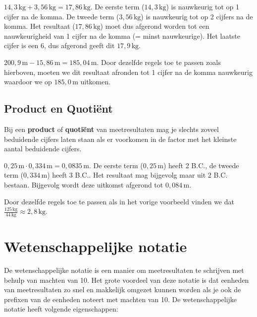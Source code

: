 \documentclass{ximera}
\begin{document}
\begin{example}[title={B.C. Plus}]\nl
    $14{,}3 \, \mathrm{kg} + 3{,}56 \, \mathrm{kg} = 17{,}86 \, \mathrm{kg}$. De eerste term ($14{,}3 \, \mathrm{kg}$) is nauwkeurig tot op 1 cijfer na de komma. De tweede term ($3{,}56 \, \mathrm{kg}$) is nauwkeurig tot op 2 cijfers na de komma. Het resultaat ($17{,}86 \, \mathrm{kg}$) moet dus afgerond worden tot een nauwkeurigheid van 1 cijfer na de komma (= minst nauwkeurige). Het laatste cijfer is een 6, dus afgerond geeft dit $17{,}9 \, \mathrm{kg}$.
\end{example}

\begin{example}[title={B.C. Min}]\nl
    $200{,}9 \, \mathrm{m} - 15{,}86 \, \mathrm{m} = 185{,}04 \, \mathrm{m}$. Door dezelfde regels toe te passen zoals hierboven, moeten we dit resultaat afronden tot 1 cijfer na de komma nauwkeurig waardoor we op $185{,}0 \, \mathrm{m}$ uitkomen.
\end{example}

\subsection{Product en Quotiënt}
\begin{proposition}\nl
    Bij een \textbf{product} of \textbf{quotiënt} van meetresultaten mag je slechts zoveel beduidende cijfers laten staan als er voorkomen in de factor met het kleinste aantal beduidende cijfers.
\end{proposition}

\begin{example}[title={B.C. Product}]\nl
    $0{,}25 \, \mathrm{m} \cdot 0{,}334 \, \mathrm{m} = 0{,}0835 \, \mathrm{m}$. De eerste term ($0{,}25 \, \mathrm{m}$) heeft 2 B.C., de tweede term ($0{,}334 \, \mathrm{m}$) heeft 3 B.C.. Het resultaat mag bijgevolg maar uit 2 B.C. bestaan. Bijgevolg wordt deze uitkomst afgerond tot $0{,}084 \, \mathrm{m}$.
\end{example}

\begin{example}[title={B.C. Quotiënt}]\nl
    Door dezelfde regels toe te passen als in het vorige voorbeeld vinden we dat $\frac{125 \, \mathrm{kg}}{44 \, \mathrm{kg}} \approx 2{,}8 \, \mathrm{kg}$.
\end{example}

\section{Wetenschappelijke notatie}
De wetenschappelijke notatie is een manier om meetresultaten te schrijven met behulp van machten van 10. Het grote voordeel van deze notatie is dat eenheden van meetresultaten zo snel en makkelijk omgezet kunnen worden als je ook de prefixen van de eenheden noteert met machten van 10. De wetenschappelijke notatie heeft volgende eigenschappen:
\end{document}
